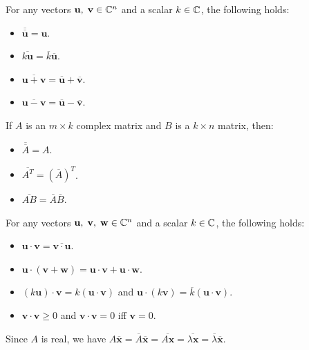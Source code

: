 For any vectors \(\mathbf{u},\;\mathbf{v} \in \mathbb{C}^n\) and a scalar \(k \in \mathbb{C}\), the following holds:
\begin{itemize}
    \item \(\overline{\overline{\mathbf{u}}} = \mathbf{u}\).
    \item \(\overline{k\mathbf{u}} = \overline{k}\overline{\mathbf{u}}\).
    \item \(\overline{\mathbf{u} + \mathbf{v}} = \overline{\mathbf{u}} + \overline{\mathbf{v}}\).
    \item \(\overline{\mathbf{u} - \mathbf{v}} = \overline{\mathbf{u}} - \overline{\mathbf{v}}\).
\end{itemize}
If \(A\) is an \(m \times k\) complex matrix and \(B\) is a \(k \times n\) matrix, then:
\begin{itemize}
    \item \(\overline{\overline{A}} = A\).
    \item \(\overline{A^T} = (\overline{A})^T\).
    \item \(\overline{AB} = \overline{A}\overline{B}\).
\end{itemize}
For any vectors \(\mathbf{u},\;\mathbf{v},\;\mathbf{w} \in \mathbb{C}^n\) and a scalar \(k \in \mathbb{C}\), the following holds:
\begin{itemize}
    \item \(\mathbf{u} \cdot \mathbf{v} = \overline{\mathbf{v} \cdot \mathbf{u}}\).
    \item \(\mathbf{u} \cdot (\mathbf{v} + \mathbf{w}) = \mathbf{u} \cdot \mathbf{v} + \mathbf{u} \cdot \mathbf{w}\).
    \item \((k \mathbf{u}) \cdot \mathbf{v} = k(\mathbf{u} \cdot \mathbf{v})\) and \(\mathbf{u} \cdot (k \mathbf{v}) = \overline{k}(\mathbf{u} \cdot \mathbf{v})\).
    \item \(\mathbf{v} \cdot \mathbf{v} \geq 0\) and \(\mathbf{v} \cdot \mathbf{v} = 0\) iff \(\mathbf{v} = 0\).
\end{itemize}

{Since \(A\) is real, we have \(A\overline{\mathbf{x}} = \overline{A}\overline{\mathbf{x}} = \overline{A\mathbf{x}} = \overline{\lambda\mathbf{x}} = \overline{\lambda}\overline{\mathbf{x}}\).}

